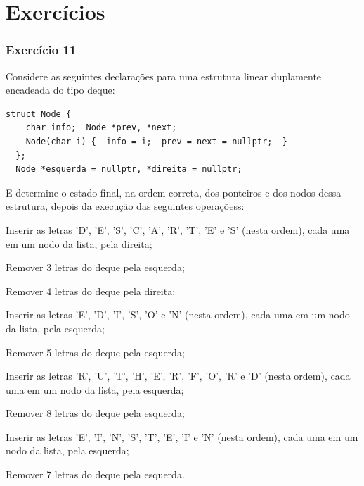 \documentclass[aspectratio=169]{beamer}
\begin{document}
\section{Exercícios}

\begin{frame}[fragile]\frametitle{Exercício 11}
\begin{enumerate}
        \setcounter{enumi}{10}
{\footnotesize
	\item Considere as seguintes declarações para uma estrutura linear duplamente encadeada do tipo deque:
\begin{lstlisting}[basicstyle=\ttfamily\tiny]
  struct Node {
    char info;  Node *prev, *next;
    Node(char i) {  info = i;  prev = next = nullptr;  }
  };
  Node *esquerda = nullptr, *direita = nullptr;
\end{lstlisting}
E determine o estado final, na ordem correta, dos ponteiros e dos nodos dessa estrutura, depois da execução das seguintes operaçõess:
	\begin{itemize}
{\scriptsize
		\item Inserir as letras 'D', 'E', 'S', 'C', 'A', 'R', 'T', 'E' e 'S' (nesta ordem), cada uma em um nodo da lista, pela direita;
		\item Remover 3 letras do deque pela esquerda;
		\item Remover 4 letras do deque pela direita;
		\item Inserir as letras 'E', 'D', 'I', 'S', 'O' e 'N' (nesta ordem), cada uma em um nodo da lista, pela esquerda;
		\item Remover 5 letras do deque pela esquerda;
		\item Inserir as letras 'R', 'U', 'T', 'H', 'E', 'R', 'F', 'O', 'R' e 'D' (nesta ordem), cada uma em um nodo da lista, pela esquerda;
		\item Remover 8 letras do deque pela esquerda;
		\item Inserir as letras 'E', 'I', 'N', 'S', 'T', 'E', 'I' e 'N' (nesta ordem), cada uma em um nodo da lista, pela esquerda;
		\item Remover 7 letras do deque pela esquerda.
}
	\end{itemize}
}
\end{enumerate}
\end{frame}
\end{document}
